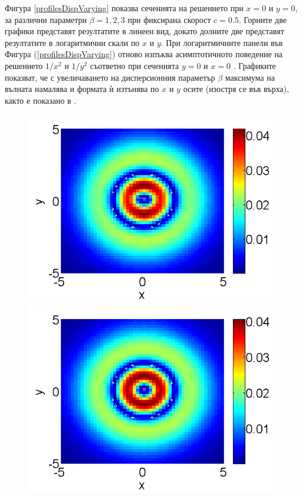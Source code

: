 \documentclass{article}
\newcommand{\rf}[1]{(\ref{#1})}
\begin{document}
Фигура \ref{profilesDispVarying} показва сеченията на решението при $x=0$ и $y=0$, за различни параметри $\beta=1, 2, 3$ при фиксирана скорост $c=0.5$. Горните две графики представят резултатите в линеен вид, докато долните две представят резултатите в логаритмични скали по $x$ и $y$. При логаритмичните панели във Фигура \rf{profilesDispVarying} отново изпъква асимптотичното поведение на решението $1/x^2$ и $1/y^2$ съответно при сеченията $y=0$ и $x=0$ \cite{ref116, ref117}. Графиките показват, че с увеличаването на дисперсионния параметър $\beta$ максимума на вълната намалява и формата ѝ изтънява по $x$ и $y$ осите (изостря се във върха), както е показано в \cite{ref116, ref117}.
\begin{figure}[htbp]
	\begin{minipage}[b]{0.48\linewidth}
		\raggedleft
		\includegraphics[width=\linewidth]{BestFitVsSimpleIter/ChristovIC_50_bt1_c017_h02_O(h^6).png}
	\end{minipage}
	\begin{minipage}[b]{0.48\linewidth}
		 \raggedright
		\includegraphics[width=\linewidth]{BestFitVsSimpleIter/ChristovIC_50_bt1_c010_h02_O(h^6).png}

\end{minipage}
\end{figure}
\end{document}
